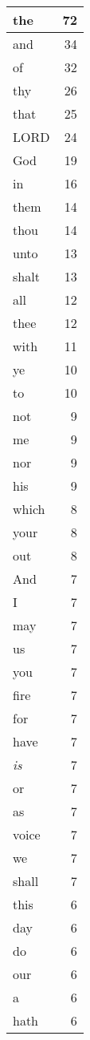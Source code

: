 \begin{center}
\begin{longtable}{l|r}
\hline \hline
\endlastfoot
the & 72 \\ \hline
and & 34 \\ \hline
of & 32 \\ \hline
thy & 26 \\ \hline
that & 25 \\ \hline
LORD & 24 \\ \hline
God & 19 \\ \hline
in & 16 \\ \hline
them & 14 \\ \hline
thou & 14 \\ \hline
unto & 13 \\ \hline
shalt & 13 \\ \hline
all & 12 \\ \hline
thee & 12 \\ \hline
with & 11 \\ \hline
ye & 10 \\ \hline
to & 10 \\ \hline
not & 9 \\ \hline
me & 9 \\ \hline
nor & 9 \\ \hline
his & 9 \\ \hline
which & 8 \\ \hline
your & 8 \\ \hline
out & 8 \\ \hline
And & 7 \\ \hline
I & 7 \\ \hline
may & 7 \\ \hline
us & 7 \\ \hline
you & 7 \\ \hline
fire & 7 \\ \hline
for & 7 \\ \hline
have & 7 \\ \hline
\emph{is} & 7 \\ \hline
or & 7 \\ \hline
as & 7 \\ \hline
voice & 7 \\ \hline
we & 7 \\ \hline
shall & 7 \\ \hline
this & 6 \\ \hline
day & 6 \\ \hline
do & 6 \\ \hline
our & 6 \\ \hline
a & 6 \\ \hline
hath & 6 \\ \hline

\end{longtable}
\end{center}
